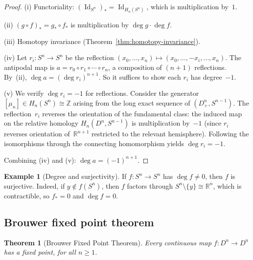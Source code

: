 \documentclass[12pt,a4paper,openany]{book}
\theoremstyle{definition}
\newtheorem{example}[definition]{Example}
\theoremstyle{plain}
\newtheorem{theorem}[definition]{Theorem}
\theoremstyle{remark}
\newcommand{\Z}{\mathbb{Z}}
\newcommand{\R}{\mathbb{R}}
\DeclareMathOperator{\Id}{Id}
\begin{document}
\begin{proof}
(i) Functoriality: $(\Id_{S^n})_*=\Id_{H_n(S^n)}$, which is multiplication
by~$1$.

(ii) $(g\circ f)_*=g_*\circ f_*$ is multiplication by
$\deg g\cdot\deg f$.

(iii) Homotopy invariance (Theorem~\ref{thm:homotopy-invariance}).

(iv) Let $r_i\colon S^n\to S^n$ be the reflection
$(x_0,\dots,x_n)\mapsto(x_0,\dots,-x_i,\dots,x_n)$.  The antipodal map
is $a=r_0\circ r_1\circ\cdots\circ r_n$, a composition of $(n{+}1)$
reflections.  By~(ii), $\deg a=(\deg r_i)^{n+1}$.  So it suffices to
show each $r_i$ has degree~$-1$.

(v) We verify $\deg r_i=-1$ for reflections.  Consider the
generator $[\mu_n]\in H_n(S^n)\cong\Z$ arising from the long exact
sequence of $(D^n_+,S^{n-1})$.  The reflection~$r_i$ reverses the
orientation of the fundamental class: the induced map on the relative
homology $H_n(D^n,S^{n-1})$ is multiplication by~$-1$ (since $r_i$
reverses orientation of~$\R^{n+1}$ restricted to the relevant hemisphere).
Following the isomorphisms through the connecting homomorphism yields
$\deg r_i=-1$.

Combining (iv) and (v): $\deg a=(-1)^{n+1}$.
\end{proof}

\begin{example}[Degree and surjectivity]\label{ex:degree-surjective}
If $f\colon S^n\to S^n$ has $\deg f\ne 0$, then $f$ is surjective.
Indeed, if $y\notin f(S^n)$, then $f$ factors through
$S^n\setminus\{y\}\cong\R^n$, which is contractible, so $f_*=0$
and $\deg f=0$.
\end{example}

\subsection{Brouwer fixed point theorem}\label{subsec:brouwer}

\begin{theorem}[Brouwer Fixed Point Theorem]\label{thm:brouwer}
Every continuous map $f\colon D^n\to D^n$ has a fixed point, for all
$n\ge 1$.
\end{theorem}
\end{document}
